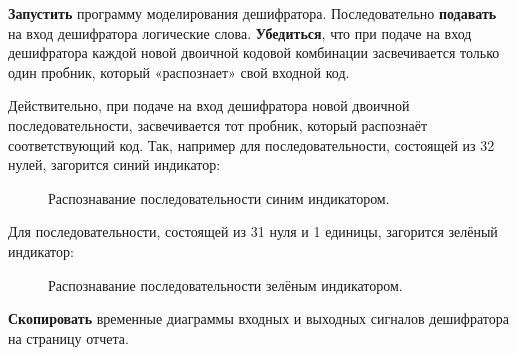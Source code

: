 \documentclass[spec, och, otchet, hidelinks]{SCWorks}
\begin{document}
\par \textbf{Запустить} программу моделирования дешифратора. Последовательно 
\textbf{подавать} на вход дешифратора логические слова. \textbf{Убедиться}, что при 
подаче на вход дешифратора каждой новой двоичной кодовой комбинации засвечивается 
только один пробник, который «распознает» свой входной код.

\newpage

\par Действительно, при подаче на вход дешифратора новой двоичной последовательности, 
засвечивается тот пробник, который распознаёт соответствующий код. Так, например для 
последовательности, состоящей из 32 нулей, загорится синий индикатор:

\begin{figure}[h]
	\caption{Распознавание последовательности синим индикатором.}
\end{figure}

\par Для последовательности, состоящей из 31 нуля и 1 единицы, загорится зелёный индикатор:

\begin{figure}[h]
	\caption{Распознавание последовательности зелёным индикатором.}
\end{figure}

\newpage

\par \textbf{Скопировать} временные диаграммы входных и выходных сигналов дешифратора
на страницу отчета. 
\end{document}
